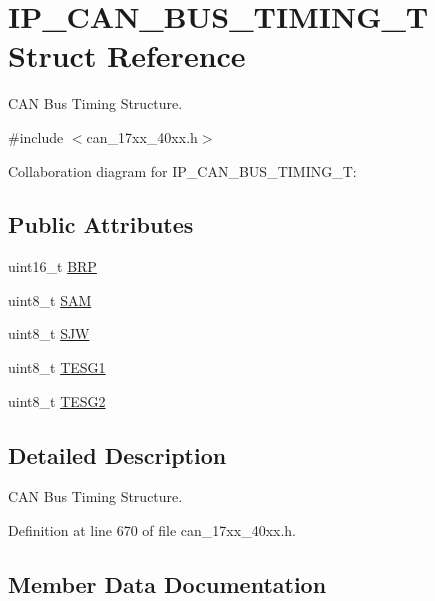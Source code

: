 \hypertarget{structIP__CAN__BUS__TIMING__T}{}\section{I\+P\+\_\+\+C\+A\+N\+\_\+\+B\+U\+S\+\_\+\+T\+I\+M\+I\+N\+G\+\_\+T Struct Reference}
\label{structIP__CAN__BUS__TIMING__T}


C\+AN Bus Timing Structure.  




{\ttfamily \#include $<$can\+\_\+17xx\+\_\+40xx.\+h$>$}



Collaboration diagram for I\+P\+\_\+\+C\+A\+N\+\_\+\+B\+U\+S\+\_\+\+T\+I\+M\+I\+N\+G\+\_\+T\+:
\subsection*{Public Attributes}
\begin{DoxyCompactItemize}
\item 
uint16\+\_\+t \hyperlink{structIP__CAN__BUS__TIMING__T_a18fb5e94652c78dd8468b7a374699643}{B\+RP}
\item 
uint8\+\_\+t \hyperlink{structIP__CAN__BUS__TIMING__T_a3313ced0f84d23e3caf050a530119fb9}{S\+AM}
\item 
uint8\+\_\+t \hyperlink{structIP__CAN__BUS__TIMING__T_a6f3d35851d3119d9d04096d08d41d289}{S\+JW}
\item 
uint8\+\_\+t \hyperlink{structIP__CAN__BUS__TIMING__T_ad1295003e524b683f247ea0dd4372380}{T\+E\+S\+G1}
\item 
uint8\+\_\+t \hyperlink{structIP__CAN__BUS__TIMING__T_a67805cda8a3bb4be441ac2ebd25ed3a7}{T\+E\+S\+G2}
\end{DoxyCompactItemize}


\subsection{Detailed Description}
C\+AN Bus Timing Structure. 

Definition at line 670 of file can\+\_\+17xx\+\_\+40xx.\+h.



\subsection{Member Data Documentation}
